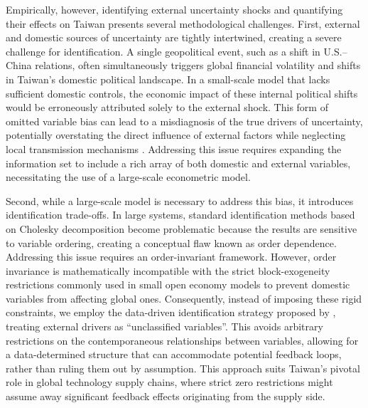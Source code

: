 Empirically, however, identifying external uncertainty shocks and quantifying their effects on Taiwan presents several methodological challenges. First, external and domestic sources of uncertainty are tightly intertwined, creating a severe challenge for identification. A single geopolitical event, such as a shift in U.S.--China relations, often simultaneously triggers global financial volatility and shifts in Taiwan's domestic political landscape. In a small-scale model that lacks sufficient domestic controls, the economic impact of these internal political shifts would be erroneously attributed solely to the external shock. This form of omitted variable bias can lead to a misdiagnosis of the true drivers of uncertainty, potentially overstating the direct influence of external factors while neglecting local transmission mechanisms \citep{carriero2018measuring}. Addressing this issue requires expanding the information set to include a rich array of both domestic and external variables, necessitating the use of a large-scale econometric model.

Second, while a large-scale model is necessary to address this bias, it introduces identification trade-offs. In large systems, standard identification methods based on Cholesky decomposition become problematic because the results are sensitive to variable ordering, creating a conceptual flaw known as order dependence. Addressing this issue requires an order-invariant framework. However, order invariance is mathematically incompatible with the strict block-exogeneity restrictions commonly used in small open economy models to prevent domestic variables from affecting global ones. Consequently, instead of imposing these rigid constraints, we employ the data-driven identification strategy proposed by \citet{davidson2025investigating}, treating external drivers as ``unclassified variables''. This avoids arbitrary restrictions on the contemporaneous relationships between variables, allowing for a data-determined structure that can accommodate potential feedback loops, rather than ruling them out by assumption. This approach suits Taiwan's pivotal role in global technology supply chains, where strict zero restrictions might assume away significant feedback effects originating from the supply side.

